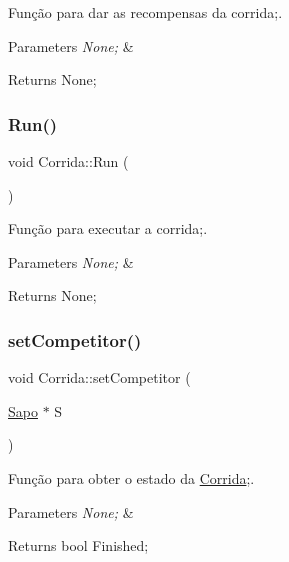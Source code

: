 Função para dar as recompensas da corrida;. 


\begin{DoxyParams}{Parameters}
{\em None;} & \\
\hline
\end{DoxyParams}
\begin{DoxyReturn}{Returns}
None; 
\end{DoxyReturn}
\mbox{\label{class_corrida_a836b007451d1382a11e9c064d7167f7a}} 
\subsubsection{\texorpdfstring{Run()}{Run()}}
{\footnotesize\ttfamily void Corrida\+::\+Run (\begin{DoxyParamCaption}{ }\end{DoxyParamCaption})}



Função para executar a corrida;. 


\begin{DoxyParams}{Parameters}
{\em None;} & \\
\hline
\end{DoxyParams}
\begin{DoxyReturn}{Returns}
None; 
\end{DoxyReturn}
\mbox{\label{class_corrida_a11e1744d2bd8c61053822b45e31d8368}} 
\subsubsection{\texorpdfstring{set\+Competitor()}{setCompetitor()}}
{\footnotesize\ttfamily void Corrida\+::set\+Competitor (\begin{DoxyParamCaption}\item[{\mbox{\hyperlink{class_sapo}{Sapo}} $\ast$}]{S }\end{DoxyParamCaption})}



Função para obter o estado da \mbox{\hyperlink{class_corrida}{Corrida}};. 


\begin{DoxyParams}{Parameters}
{\em None;} & \\
\hline
\end{DoxyParams}
\begin{DoxyReturn}{Returns}
bool Finished; 
\end{DoxyReturn}
\mbox{\label{class_corrida_a828591ae64bb090f267b3f8612838c25}} 
